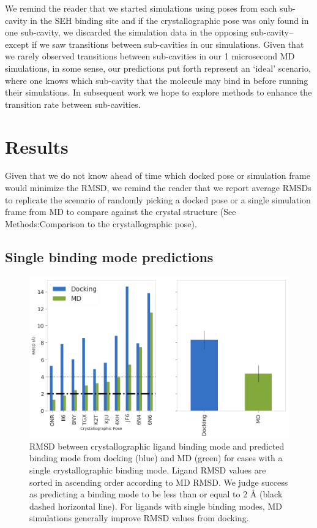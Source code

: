 We remind the reader that we started simulations using poses from each sub-cavity in the SEH binding site and if the crystallographic pose was only found in one sub-cavity, we discarded the simulation data in the opposing sub-cavity--except if we saw transitions between sub-cavities in our simulations.
Given that we rarely observed transitions between sub-cavities in our 1 microsecond MD simulations, in some sense, our predictions put forth represent an `ideal' scenario, where one knows which sub-cavity that the molecule may bind in before running their simulations. 
In subsequent work we hope to explore methods to enhance the transition rate between sub-cavities.

\section{Results}
Given that we do not know ahead of time which docked pose or simulation frame would minimize the RMSD, we remind the reader that we report average RMSDs to replicate the scenario of randomly picking a docked pose or a single simulation frame from MD to compare against the crystal structure (See Methods:Comparison to the crystallographic pose).

\subsection{Single binding mode predictions}
\begin{figure}
    \centering
    \includegraphics[width=\linewidth]{chapter5/Figures/cluster3_seh_singlebm.png}
    \caption[SEH MD Single Binding Mode Ligands]{RMSD between crystallographic ligand binding mode and predicted binding mode from docking (blue) and MD (green) for cases with a single crystallographic binding mode. Ligand RMSD values are sorted in ascending order according to MD RMSD. We judge success as predicting a binding mode to be less than or equal to 2 {\AA} (black dashed horizontal line). For ligands with single binding modes, MD simulations generally improve RMSD values from docking.}
    \label{fig:rmsd-singlebm}
\end{figure}

